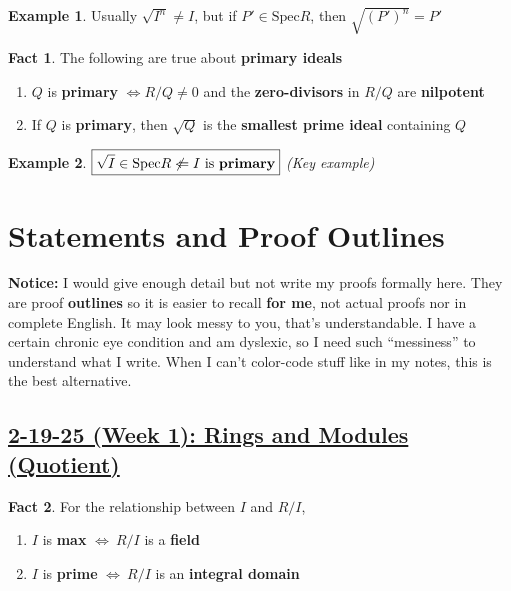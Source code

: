 \documentclass[12pt,a4paper]{article}
\theoremstyle{definition}
\newtheorem{fact}{Fact}
\newtheorem{example}{Example}
\begin{document}
\begin{example}
  Usually $\sqrt{I^n} \neq I$, but if \underline{$P' \in \text{Spec}R$}, then $\boxed{\sqrt{(P')^n} = P'}$
\end{example}
\vspace{0.125em}

\begin{fact}
  The following are true about \textbf{primary ideals}
  \begin{enumerate} [(1)]
    \item $Q$ is \textbf{primary} $\Leftrightarrow R/Q \neq 0$ and the \textbf{zero-divisors} in $R/Q$ are \textbf{nilpotent}
    \item If $Q$ is \textbf{primary}, then $\sqrt{Q}$ is the \textbf{smallest prime ideal} containing $Q$
  \end{enumerate}
\end{fact}
\vspace{0.125em}

\begin{example}
  $\boxed{\sqrt{I} \in \text{Spec}R \not\Leftarrow I \text{ is \textbf{primary}}}$ \textit{(Key example)}
\end{example}
\vspace{0.125em}
\newpage

\section*{Statements and Proof Outlines}
\begin{mdframed}
\textbf{Notice:} I would give enough detail but not write my proofs formally here. They are proof \textbf{outlines} so it is easier to recall \textbf{for me}, not actual proofs nor in complete English. It may look messy to you, that's understandable. I have a certain chronic eye condition and am dyslexic, so I need such ``messiness'' to understand what I write. When I can't color-code stuff like in  my notes, this is the best alternative.
\end{mdframed}

\setcounter{subsection}{1}
\setcounter{theorem}{0}
\setcounter{lemma}{0}
\setcounter{proposition}{0}
\setcounter{corollary}{0}
\setcounter{fact}{0}
\setcounter{claim}{0}
\setcounter{example}{0}
\subsection*{\underline{\textbf{2-19-25 (Week 1): Rings and Modules (Quotient)}}}
\begin{tcolorbox}
\begin{fact}
  For the relationship between $I$ and $R/I$,
  \begin{enumerate} [(1)]
    \item $I$ is \textbf{max} $\Leftrightarrow \ R/I$ is a \textbf{field}
    \item $I$ is \textbf{prime} $\Leftrightarrow \ R/I$ is an \textbf{integral domain}
  \end{enumerate}
\end{fact}
\end{tcolorbox}
\end{document}
